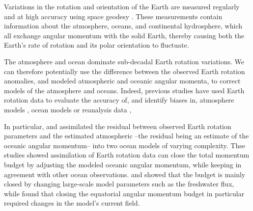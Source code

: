 
Variations in the rotation and orientation of the Earth are measured regularly and at high accuracy using space geodesy \citep{Gross1992,iers}. 
These measurements contain information about the atmosphere, oceans, and continental hydrosphere, which all exchange angular momentum with the solid Earth, thereby causing both the Earth's rate of rotation and its polar orientation to fluctuate. 

The atmosphere and ocean dominate sub-decadal Earth rotation variations. 
We can therefore potentially use the difference between the observed Earth rotation anomalies, and modeled atmospheric and oceanic angular momenta, to correct models of the atmosphere and oceans. 
Indeed, previous studies have used Earth rotation data to evaluate the accuracy of, 
and identify biases in, atmosphere models \citep{Boer1990, Rosen2000}, ocean 
models \citep{Gross1996a} or reanalysis data \citep{Yu1999, Aoyama2000, 
Paek2012a},

In particular, \citet{Saynisch2010,Saynisch2011} and \citet{Saynisch2012} assimilated the residual between observed Earth rotation parameters and the estimated atmospheric --the residual being an estimate of the oceanic angular momentum-- into two ocean models of varying complexity. 
Thse studies showed assimilation of Earth rotation data can close the total momentum budget by adjusting the modeled oceanic angular momentum, while keeping in agreement with other ocean observations.  
\citet{Saynisch2010} and \citet{Saynisch2012} showed that the budget is mainly closed by changing large-scale model parameters such as the freshwater flux, while \citet{Saynisch2011} found that closing the equatorial angular momentum budget in particular required changes in the model's current field. 


